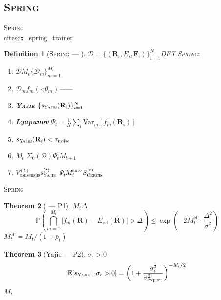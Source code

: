 \documentclass[12pt,a4paper]{article}
\newtheorem{theorem}{Theorem}[section]
\newtheorem{definition}[theorem]{Definition}
\theoremstyle{remark}
\newcommand{\E}{\mathbb{E}}
\newcommand{\Pbb}{\mathbb{P}}
\newcommand{\Var}{\mathrm{Var}}
\newcommand{\D}{\mathcal{D}}
\newcommand{\Spring}{\textsc{Spring}}
\newcommand{\Yajie}{\textsc{Yajie}}
\newcommand{\Cercis}{\textsc{Cercis}}
\newcommand{\Mauto}{\ensuremath{M_t^{\text{auto}}}}
\newcommand{\Lyap}{\ensuremath{\Psi}}
\begin{document}
\subsection{\Spring{}}

\Spring{}~\\cite{scx_spring_trainer}


\begin{definition}[\Spring{} — ]\label{def:physics_spring}
$\D = \{(\mathbf{R}_i, E_i, \mathbf{F}_i)\}_{i=1}^{N}$DFT
\Spring{}$t$
\begin{enumerate}[label= \arabic*,leftmargin=*,itemsep=2pt]
    \item \textbf{} $\D$$M_t$$\{\D_m\}_{m=1}^{M_t}$
    \item \textbf{} $\D_m$$f_m(\cdot; \theta_m)$——
    
    \item \textbf{\Yajie{}} $\{s_{\Yajie}(\mathbf{R}_i)\}_{i=1}^{N}$
    \item \textbf{Lyapunov} $\Lyap_t = \frac{1}{N}\sum_i \Var_m[f_m(\mathbf{R}_i)]$
    \item \textbf{} $s_{\Yajie}(\mathbf{R}_i) < \tau_{\text{noise}}$
    \item \textbf{$M_t$} $\Sigma_0(\D)$$\Lyap_t$$M_{t+1}$
    \item \textbf{} $V^{(t)}_{\text{consensus}}$$\mathbf{s}^{(t)}_{\Yajie}$
    $\Lyap_t$$\Mauto$$S^{(t)}_{\Cercis}$
\end{enumerate}
\end{definition}

\Spring{}\cite{scx_spring_trainer}

\begin{theorem}[ — P1]\label{thm:P1}
$M_t$$\Delta$
\begin{equation}
    \Pbb\left(\bigcap_{m=1}^{M_t} |f_m(\mathbf{R}) - E_{\text{ref}}(\mathbf{R})| > \Delta\right) \leq 
    \exp\left(-2 M_t^{\text{eff}} \cdot \frac{\Delta^2}{\bar{\sigma}^2}\right)
\end{equation}
$M_t^{\text{eff}} = M_t / (1 + \bar{\rho}_t)$
\end{theorem}

\begin{theorem}[Yajie — P2]\label{thm:P2}
$\sigma_\epsilon > 0$
\begin{equation}
    \E[s_{\Yajie} \mid \sigma_\epsilon > 0] = \left(1 + \frac{\sigma_\epsilon^2}{\bar{\sigma}_{\text{expert}}^2}\right)^{-M_t/2}
\end{equation}
$M_t$
\end{theorem}
\end{document}
